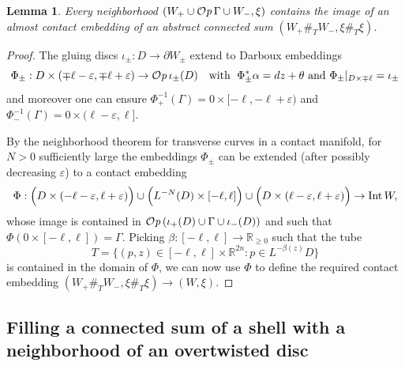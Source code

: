 \documentclass[12pt]{paper}
\theoremstyle{plain}
\newtheorem{lemma}[theorem]{Lemma}
\theoremstyle{definition}
\newcommand{\p}{\partial}
\newcommand{\eps}{\varepsilon}
\newcommand{\R}{{\mathbb{R}}}
\newcommand{\Int}{{\rm Int\,}} %
\def\Op{{\mathcal O}{\it p}\,}
\numberwithin{figure}{section}
\begin{document}
	\begin{lemma}\label{l:Ambient=Abstract}
		Every neighborhood $(W_+ \cup \Op \Gamma \cup W_-, \xi)$ contains the image of
		an almost contact embedding of an abstract connected sum $(W_+ \#_{T} W_-, \xi \#_{T} \xi)$.
\end{lemma}
\begin{proof}
The gluing discs $\iota_\pm:D \to\p W_\pm$ extend to Darboux embeddings  
 \begin{equation*} 
 \Phi_\pm: D \times (\mp\ell-\eps, \mp\ell+\eps) \to \Op \iota_\pm (D) \quad\mbox{with } \;\Phi_\pm^* \alpha = dz + \theta
 \mbox{ and } \Phi_\pm|_{D \times \mp \ell} = \iota_\pm
\end{equation*}
and moreover one can ensure $\Phi_+^{-1} (\Gamma)=0 \times [-\ell,-\ell+\eps )$ and $\Phi_-^{-1}(\Gamma)=0 \times (\ell-\eps,\ell]$.

By the neighborhood theorem for transverse curves in a contact manifold, for $N > 0$ sufficiently large the embeddings
$\Phi_\pm$ can be extended (after possibly decreasing $\eps$)  to a contact embedding  
$$
	\Phi: \Big(D \times (-\ell-\eps, \ell+\eps)\Big)\cup \Big(L^{-N}(D) \times [-\ell,\ell] \Big)\cup 
	\Big(D \times (\ell-\eps, \ell+\eps)\Big) \to \Int W,
$$ 
whose image is contained in $\Op(\iota_+(D) \cup \Gamma \cup \iota_-(D))$ and such that $\Phi(0 \times [-\ell,\ell])=\Gamma$.
Picking $\beta:[-\ell,\ell]\to\R_{\geq 0}$ such that the tube
 $$T=  \{(p,z) \in [-\ell, \ell] \times \R^{2n} : p \in L^{-\beta(z)}D \} $$
is contained in the domain of $\Phi$, we can now use $\Phi$ to define the required contact embedding
 $(W_+ \#_{T} W_-, \xi \#_{T} \xi) \to (W,\xi)$.
 \end{proof}






\subsection{Filling a connected sum of a shell with a neighborhood of an overtwisted disc}
\end{document}
